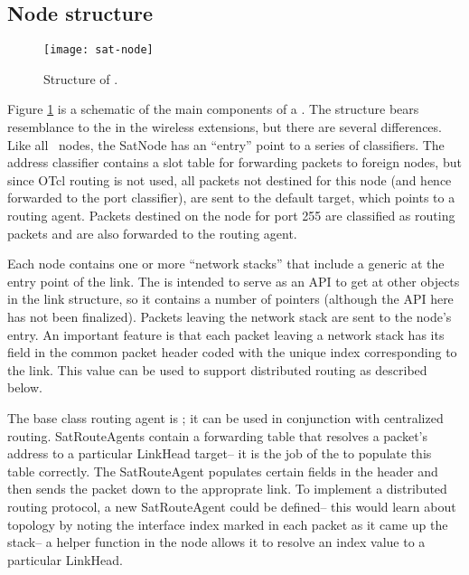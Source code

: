 \subsection{Node structure}

\begin{figure}
    \centerline{\texttt{[image: sat-node]}}
    \caption{Structure of .}
    \label{fig:sat-node}
\end{figure}

Figure \ref{fig:sat-node} is a schematic of the main components of a
.  The structure bears resemblance to the 
in the wireless extensions, but there are several differences.  Like all
\ns~nodes, the SatNode has an ``entry'' point to a series of classifiers.
The address classifier contains a slot table for forwarding packets to 
foreign nodes, but since OTcl routing is not used, all packets not destined
for this node (and hence forwarded to the port classifier), are sent to
the default target, which points to a routing agent.  Packets destined
on the node for port 255 are classified as routing packets and are also
forwarded to the routing agent.

Each node contains one or more ``network stacks'' that include a generic
 at the entry point of the link.  The 
is intended to serve as an API to get at other objects in the link structure,
so it contains a number of pointers (although the API here has not been
finalized).  Packets leaving the network stack are sent to the node's
entry.  An important feature is that each packet leaving a network stack
has its  field in the common packet header coded with the
unique  index corresponding to the link.  This value
can be used to support distributed routing as described below.

The base class routing agent is ; it can be used 
in conjunction with centralized routing.  SatRouteAgents contain
a forwarding table that resolves a packet's address to a particular 
LinkHead target-- it is the job of the  to populate this
table correctly.  The SatRouteAgent populates certain fields in the header
and then sends the packet down to the approprate link.  To implement
a distributed routing protocol, a new SatRouteAgent could be defined-- this
would learn about topology by noting the interface index marked in each 
packet as it came up the stack-- a helper function in the node 
 allows it to resolve an index value to
a particular LinkHead. 


